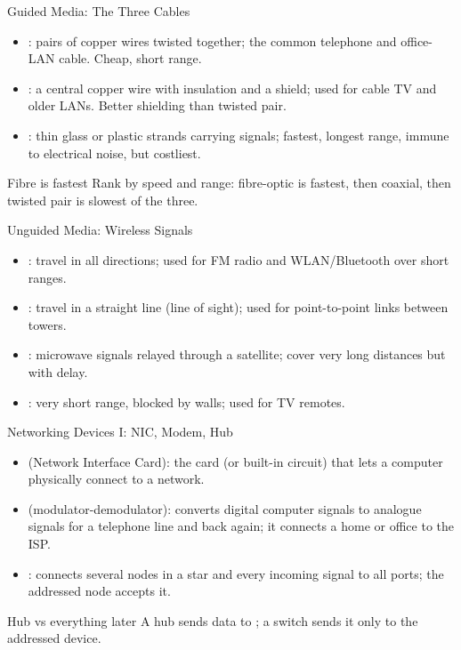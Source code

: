 \documentclass[aspectratio=169]{beamer}
\begin{document}
\begin{frame}{Guided Media: The Three Cables}
  \begin{itemize}
    \item {}: pairs of copper wires twisted together;
      the common telephone and office-LAN cable. Cheap, short range.
    \item {}: a central copper wire with insulation and a
      shield; used for cable TV and older LANs. Better shielding than
      twisted pair.
    \item {}: thin glass or plastic strands carrying
       signals; fastest, longest range, immune to electrical
      noise, but costliest.
  \end{itemize}
  \begin{alertblock}{Fibre is fastest}
    Rank by speed and range: fibre-optic is fastest, then coaxial, then
    twisted pair is slowest of the three.
  \end{alertblock}
\end{frame}

\begin{frame}{Unguided Media: Wireless Signals}
  \begin{itemize}
    \item {}: travel in all directions; used for FM radio and
      WLAN/Bluetooth over short ranges.
    \item {}: travel in a straight line (line of sight); used
      for point-to-point links between towers.
    \item {}: microwave signals relayed through a
      satellite; cover very long distances but with delay.
    \item {}: very short range, blocked by walls; used for TV
      remotes.
  \end{itemize}
\end{frame}

\begin{frame}{Networking Devices I: NIC, Modem, Hub}
  \begin{itemize}
    \item {} (Network Interface Card): the card (or built-in circuit)
      that lets a computer physically connect to a network.
    \item {} (modulator-demodulator): converts digital computer
      signals to analogue signals for a telephone line and back again; it
      connects a home or office to the ISP.
    \item {}: connects several nodes in a star and 
      every incoming signal to all ports; the addressed node accepts it.
  \end{itemize}
  \begin{block}{Hub vs everything later}
    A hub sends data to ; a switch sends it only to the
    addressed device.
  \end{block}
\end{frame}
\end{document}
